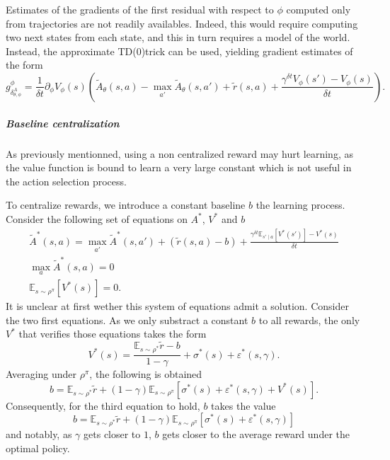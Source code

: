 \documentclass[11pt]{article}
\newcommand{\deltat}{{\delta t}}
\newcommand{\E}{\mathbb{E}}
\newcommand{\Tdo}{TD($0$)}
\begin{document}
Estimates of the gradients of the first residual with respect to $\phi$ computed only
from trajectories are not readily availables. Indeed, this would require computing two
next states from each state, and this in turn requires a model of the world. Instead,
the approximate \Tdo trick can be used, yielding gradient estimates of the form
\begin{equation}
	g^\phi_{\delta^A_{\theta, \phi}} =
	\frac{1}{\deltat}
	\partial_\phi V_\phi(s) \left(\tilde{A}_\theta(s, a) -
		\max\limits_{a'} \tilde{A}_\theta(s, a') + 
		\tilde{r}(s, a)
		+ 
		\frac{\gamma^\deltat 
			V_\phi(s')
			- V_\phi(s)
			}{
			\deltat
	}\right).
\end{equation}

\subparagraph{Baseline centralization}
As previously mentionned, using a non centralized reward may hurt learning, as the
value function is bound to learn a very large constant which is not useful in the
action selection process.

To centralize rewards, we introduce a constant baseline $b$ the learning process.
Consider the following set of equations on $A^*$, $V^*$ and $b$
\begin{gather}
	\tilde{A}^*(s, a) = \max\limits_{a'} \tilde{A}^*(s, a') + 
		(\tilde{r}(s, a) - b)
		 + 
		\frac{\gamma^\deltat \E_{s'\mid a}\left[
			V^*(s')
		\right] - V^*(s)
		}{
		\deltat
	}\\
	\max\limits_{a} \tilde{A}^*(s, a) = 0\\
	\E_{s\sim \rho^\pi}\left[V^*(s)\right] = 0
	.
\end{gather}
It is unclear at first wether this system of equations admit a solution.
Consider the two first equations. As we only substract a constant $b$ to all
rewards, the only $V^*$ that verifies those equations takes the form
\begin{equation}
	V^*(s) = \frac{\E_{s\sim\rho^*}\tilde{r} - b}{1 - \gamma} +
	\sigma^*(s) + \varepsilon^*(s, \gamma).
\end{equation}
Averaging under $\rho^\pi$, the following is obtained
\begin{equation}
	b = \E_{s\sim\rho^*}\tilde{r} +
	(1 - \gamma) \E_{s\sim\rho^\pi}\left[\sigma^*(s) +
		\varepsilon^*(s, \gamma) +
		V^*(s)
	\right].
\end{equation}
Consequently, for the third equation to hold, $b$ takes the value
\begin{equation}
	b = \E_{s\sim\rho^*}\tilde{r} +
	(1 - \gamma) \E_{s\sim\rho^\pi}\left[\sigma^*(s) +
		\varepsilon^*(s, \gamma)
	\right]
\end{equation}
and notably, as $\gamma$ gets closer to $1$, $b$ gets closer to the
average reward under the optimal policy.
\end{document}
